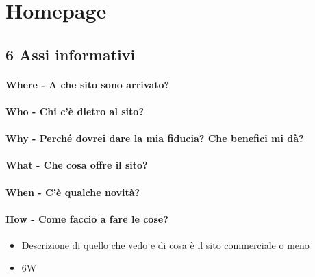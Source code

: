 \section{Homepage}
\subsection{6 Assi informativi}

\paragraph{Where - A che sito sono arrivato?}

\paragraph{Who - Chi c'è dietro al sito?}

\paragraph{Why - Perché dovrei dare la mia fiducia? Che benefici mi dà?}

\paragraph{What - Che cosa offre il sito?}

\paragraph{When - C'è qualche novità?}

\paragraph{How - Come faccio a fare le cose?}


\begin{itemize}
	\item Descrizione di quello che vedo e di cosa è il sito commerciale o meno
	\item 6W
\end{itemize}


